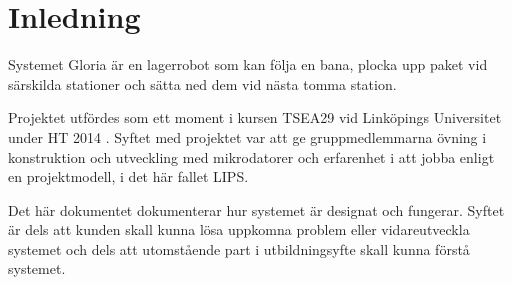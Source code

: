 
\section{Inledning}

Systemet Gloria är en lagerrobot som kan följa en bana, plocka upp paket vid särskilda stationer och sätta ned dem vid nästa tomma station.

Projektet utfördes som ett moment i kursen TSEA29 vid Linköpings Universitet under HT 2014 . Syftet med projektet var att ge gruppmedlemmarna övning i konstruktion och utveckling med mikrodatorer och erfarenhet i att jobba enligt en projektmodell, i det här fallet LIPS.

Det här dokumentet dokumenterar hur systemet är designat och fungerar. Syftet är dels att kunden skall kunna lösa uppkomna problem eller vidareutveckla systemet och dels att utomstående part i utbildningsyfte skall kunna förstå systemet.

